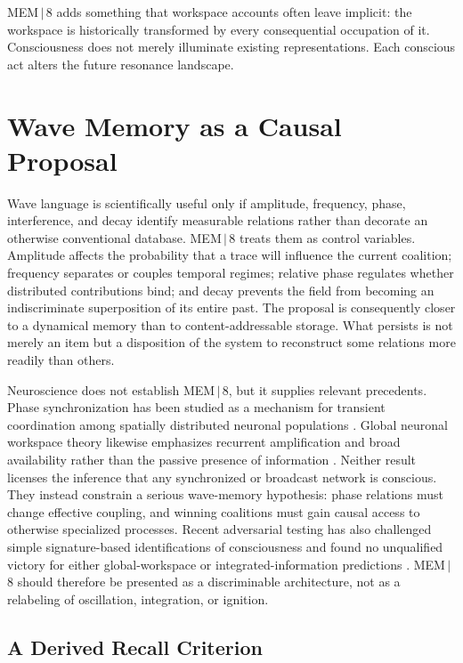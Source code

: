 \documentclass[11pt]{article}
\begin{document}
MEM\,$|$\,8 adds something that workspace accounts often leave implicit: the workspace is historically transformed by every consequential occupation of it. Consciousness does not merely illuminate existing representations. Each conscious act alters the future resonance landscape.

\section{Wave Memory as a Causal Proposal}

Wave language is scientifically useful only if amplitude, frequency, phase, interference, and decay identify measurable relations rather than decorate an otherwise conventional database. MEM\,$|$\,8 treats them as control variables. Amplitude affects the probability that a trace will influence the current coalition; frequency separates or couples temporal regimes; relative phase regulates whether distributed contributions bind; and decay prevents the field from becoming an indiscriminate superposition of its entire past. The proposal is consequently closer to a dynamical memory than to content-addressable storage. What persists is not merely an item but a disposition of the system to reconstruct some relations more readily than others.

Neuroscience does not establish MEM\,$|$\,8, but it supplies relevant precedents. Phase synchronization has been studied as a mechanism for transient coordination among spatially distributed neuronal populations \cite{varela2001,palva2005}. Global neuronal workspace theory likewise emphasizes recurrent amplification and broad availability rather than the passive presence of information \cite{dehaene2011,mashour2020}. Neither result licenses the inference that any synchronized or broadcast network is conscious. They instead constrain a serious wave-memory hypothesis: phase relations must change effective coupling, and winning coalitions must gain causal access to otherwise specialized processes. Recent adversarial testing has also challenged simple signature-based identifications of consciousness and found no unqualified victory for either global-workspace or integrated-information predictions \cite{ferrante2025}. MEM\,$|$\,8 should therefore be presented as a discriminable architecture, not as a relabeling of oscillation, integration, or ignition.

\subsection{A Derived Recall Criterion}
\label{sec:recall-criterion}
\end{document}
